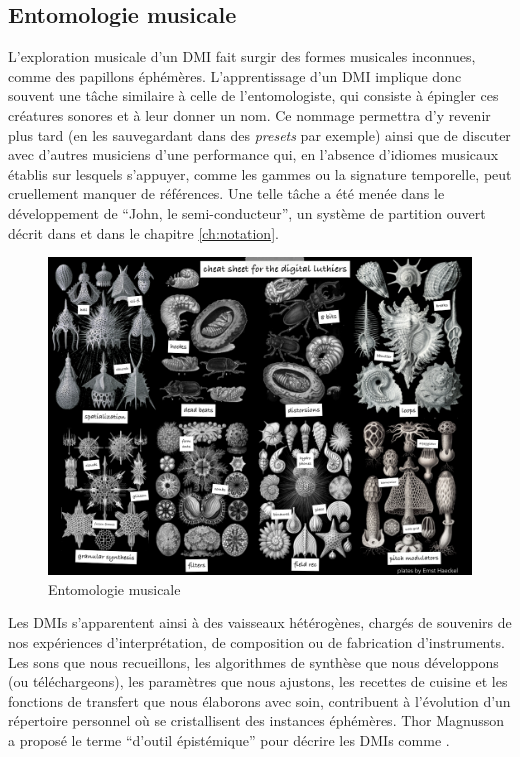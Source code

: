 \subsection{Entomologie musicale}
\label{sec:ephemeral:vessels}

\noindent L'exploration musicale d'un \gls{DMI} fait surgir des formes musicales inconnues, comme des papillons éphémères. L'apprentissage d'un \gls{DMI} implique donc souvent une tâche similaire à celle de l'entomologiste, qui consiste à épingler ces créatures sonores et à leur donner un nom. Ce nommage permettra d'y revenir plus tard (en les sauvegardant dans des \textit{presets} par exemple) ainsi que de discuter avec d'autres musiciens d'une performance qui, en l'absence d'idiomes musicaux établis sur lesquels s'appuyer, comme les gammes ou la signature temporelle, peut cruellement manquer de références. Une telle tâche a été menée dans le développement de ``John, le semi-conducteur'', un système de partition ouvert décrit dans \cite{goudard_john_2018} et dans le chapitre \ref{ch:notation}.\\
\begin{figure}[!htbp]
	\captionsetup{format=plain}%
	\includegraphics[width=\textwidth]{gfx/02_ephemeral/Bestiaire.png}
	\caption{Entomologie musicale}
	\label{fig:ephemeral:entomologie}
\end{figure}
\noindent Les \glspl{DMI} s'apparentent ainsi à des vaisseaux hétérogènes, chargés de souvenirs de nos expériences d'interprétation, de composition ou de fabrication d'instruments. Les sons que nous recueillons, les algorithmes de synthèse que nous développons (ou téléchargeons), les paramètres que nous ajustons, les recettes de cuisine et les fonctions de transfert que nous élaborons avec soin, contribuent à l'évolution d'un répertoire personnel où se cristallisent des instances éphémères. Thor Magnusson a proposé le terme ``d'outil épistémique'' pour décrire les \glspl{DMI} comme  \cite{magnusson_epistemic_2009}.\\
